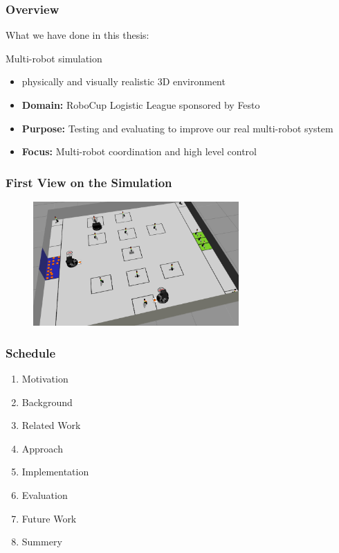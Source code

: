 \documentclass[]{beamer}
\begin{document}
\begin{frame}
  \frametitle{Overview}
  What we have done in this thesis:\\
  \begin{block}{Multi-robot simulation}
    \begin{itemize}
    \item physically and visually realistic 3D environment
    \item \textbf{Domain:} RoboCup Logistic League sponsored by Festo
    \item \textbf{Purpose:} Testing and evaluating to improve our real multi-robot system
    \item \textbf{Focus:} Multi-robot coordination and high level control
    \end{itemize}
  \end{block}
\end{frame}

\begin{frame}
  \frametitle{First View on the Simulation}

  \begin{figure}
    \includegraphics[width=0.7\textwidth]{../pics/sim_working.png}\\
  \end{figure}
\end{frame}

\begin{frame}
  \frametitle{Schedule}
  \begin{enumerate}
  \item Motivation
  \item Background
  \item Related Work
  \item Approach
  \item Implementation
  \item Evaluation
  \item Future Work
  \item Summery
  \end{enumerate}
\end{frame}
\end{document}
